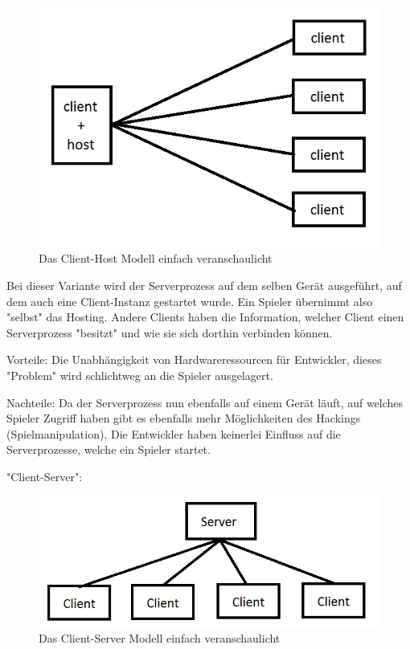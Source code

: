 \begin{figure}
	\centering
	\includegraphics{images/Client_Host.png}
	\caption[Client-Server Modell]{Das Client-Host Modell einfach veranschaulicht}
	\label{pic:Client_Host}
\end{figure}




Bei dieser Variante wird der Serverprozess auf dem selben Gerät ausgeführt, auf dem auch eine Client-Instanz gestartet wurde. Ein Spieler übernimmt also "selbst" das Hosting. Andere Clients haben die Information, welcher Client einen Serverprozess "besitzt" und wie sie sich dorthin verbinden können.

Vorteile: Die Unabhängigkeit von Hardwareressourcen für Entwickler, dieses "Problem" wird schlichtweg an die Spieler ausgelagert. 

Nachteile: Da der Serverprozess nun ebenfalls auf einem Gerät läuft, auf welches Spieler Zugriff haben gibt es ebenfalls mehr Möglichkeiten des Hackings (Spielmanipulation). Die Entwickler haben keinerlei Einfluss auf die Serverprozesse, welche ein Spieler startet.

"Client-Server":

\begin{figure}
\centering
\includegraphics{images/Client_Server.png}
\caption[Client-Server Modell]{Das Client-Server Modell einfach veranschaulicht}
\label{pic:Client_Server}
\end{figure}



